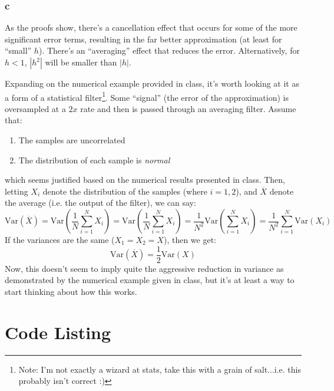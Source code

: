 \documentclass[11pt]{report}
\theoremstyle{definition}
\begin{document}
\subsubsection*{c}
As the proofs show, there's a cancellation effect that occurs for some of the
more significant error terms, resulting in the far better approximation (at
least for ``small'' $h$).  There's an ``averaging'' effect that reduces the
error. Alternatively, for $h<1$, $|h^2|$ will be smaller than $|h|$.

Expanding on the numerical example provided in class, it's worth looking at it
as a form of a statistical filter\footnote{Note: I'm not exactly a wizard at
	stats, take this with a grain of salt...i.e. this probably isn't correct :)}.
Some ``signal'' (the error of the approximation) is oversampled at a $2x$ rate
and then is passed through an averaging filter. Assume that:
\begin{enumerate}
	\item The samples are uncorrelated
	\item The distribution of each sample is \textit{normal}
\end{enumerate}
which seems justified based on the numerical results presented in class.  Then,
letting $X_i$ denote the distribution of the samples (where $i=1,2$), and
$\overline{X}$ denote the average (i.e. the output of the filter), we can say:
\[
	\mathrm{Var}(\overline{X})
	= \mathrm{Var}\left(\frac{1}{N}\sum_{i=1}^N X_i\right)
	= \mathrm{Var}\left(\frac{1}{N}\sum_{i=1}^N X_i\right)
	= \frac{1}{N^2}\mathrm{Var}\left(\sum_{i=1}^N X_i\right)
	= \frac{1}{N^2}\sum_{i=1}^N \mathrm{Var}\left(X_i\right)
\]
If the variances are the same ($X_1 = X_2 = X$), then we get:
\[ \mathrm{Var}(\overline{X}) = \frac{1}{2}\mathrm{Var}(X) \]
Now, this doesn't seem to imply quite the aggressive reduction in variance as
demonstrated by the numerical example given in class, but it's at least a way to
start thinking about how this works.

\newpage
\section*{Code Listing}
\lstset{style=mystyle}

\end{document}
